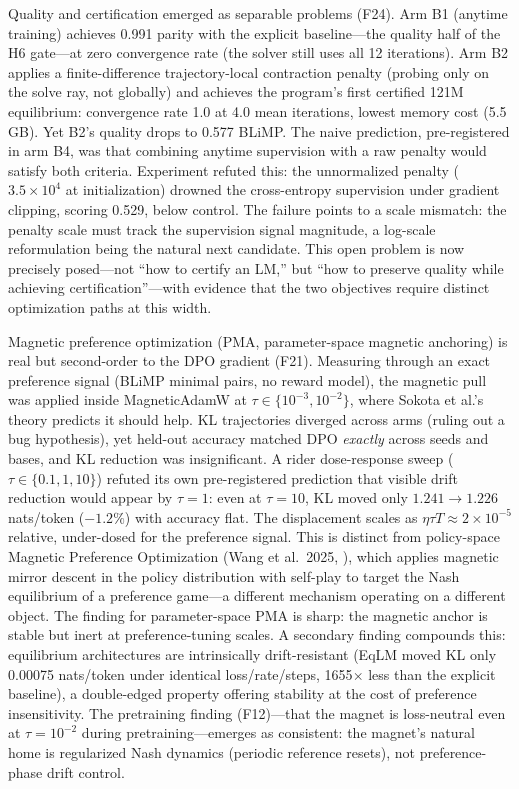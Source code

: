 Quality and certification emerged as separable problems (F24). Arm B1 (anytime training) achieves 0.991 parity with the explicit baseline---the quality half of the H6 gate---at zero convergence rate (the solver still uses all 12 iterations). Arm B2 applies a finite-difference trajectory-local contraction penalty (probing only on the solve ray, not globally) and achieves the program's first certified 121M equilibrium: convergence rate 1.0 at 4.0 mean iterations, lowest memory cost (5.5 GB). Yet B2's quality drops to 0.577 BLiMP. The naive prediction, pre-registered in arm B4, was that combining anytime supervision with a raw penalty would satisfy both criteria. Experiment refuted this: the unnormalized penalty ($3.5 \times 10^4$ at initialization) drowned the cross-entropy supervision under gradient clipping, scoring 0.529, below control. The failure points to a scale mismatch: the penalty scale must track the supervision signal magnitude, a log-scale reformulation being the natural next candidate. This open problem is now precisely posed---not ``how to certify an LM,'' but ``how to preserve quality while achieving certification''---with evidence that the two objectives require distinct optimization paths at this width.

Magnetic preference optimization (PMA, parameter-space magnetic anchoring) is real but second-order to the DPO gradient (F21). Measuring through an exact preference signal (BLiMP minimal pairs, no reward model), the magnetic pull was applied inside MagneticAdamW at $\tau \in \{10^{-3}, 10^{-2}\}$, where Sokota et al.'s theory predicts it should help. KL trajectories diverged across arms (ruling out a bug hypothesis), yet held-out accuracy matched DPO \emph{exactly} across seeds and bases, and KL reduction was insignificant. A rider dose-response sweep ($\tau \in \{0.1, 1, 10\}$) refuted its own pre-registered prediction that visible drift reduction would appear by $\tau = 1$: even at $\tau = 10$, KL moved only $1.241 \to 1.226$ nats/token ($-1.2\%$) with accuracy flat. The displacement scales as $\eta\tau T \approx 2\times 10^{-5}$ relative, under-dosed for the preference signal. This is distinct from policy-space Magnetic Preference Optimization (Wang et al.\ 2025, \cite{Wang2025MPO}), which applies magnetic mirror descent in the policy distribution with self-play to target the Nash equilibrium of a preference game---a different mechanism operating on a different object. The finding for parameter-space PMA is sharp: the magnetic anchor is stable but inert at preference-tuning scales. A secondary finding compounds this: equilibrium architectures are intrinsically drift-resistant (EqLM moved KL only 0.00075 nats/token under identical loss/rate/steps, 1655$\times$ less than the explicit baseline), a double-edged property offering stability at the cost of preference insensitivity. The pretraining finding (F12)---that the magnet is loss-neutral even at $\tau = 10^{-2}$ during pretraining---emerges as consistent: the magnet's natural home is regularized Nash dynamics (periodic reference resets), not preference-phase drift control.

